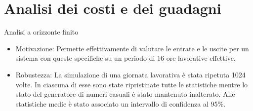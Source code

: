 \documentclass[xcolor=table]{beamer}
\begin{document}
%

\section{Analisi dei costi e dei guadagni}

\begin{frame}{Analisi a orizzonte finito}\justifying
\begin{itemize}
\item Motivazione: Permette effettivamente di valutare le entrate e le uscite per un sistema con queste specifiche su un periodo di 16 ore lavorative effettive. 

\item Robustezza: La simulazione di una giornata lavorativa è stata ripetuta 1024 volte. In ciascuna di esse sono state ripristinate tutte le statistiche mentre lo stato del generatore di numeri casuali è stato mantenuto inalterato. Alle statistiche medie è stato associato un intervallo di confidenza al 95\%. 
\end{itemize}
\end{frame}
\end{document}
